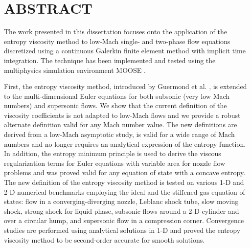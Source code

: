 %
%
%

\chapter*{ABSTRACT}

\pagestyle{plain} %
\setcounter{page}{2}

The work presented in this dissertation focuses onto the application of the entropy viscosity method to low-Mach single- and two-phase flow equations discretized using a continuous Galerkin finite element method with implicit time integration. The technique has been implemented and tested using the multiphysics simulation environment MOOSE \cite{Moose}. 

First,  
the entropy viscosity method, introduced by Guermond et al. \cite{jlg1, jlg2}, is extended to the multi-dimensional Euler 
equations for both subsonic (very low Mach numbers) and supersonic flows. 
We show that the current definition of the viscosity coefficients \cite{jlg1, jlg2} is not adapted to low-Mach flows 
and we provide a robust alternate definition valid for any Mach number value. The new definitions are derived from a 
low-Mach asymptotic study, is valid for a wide range of Mach numbers and no longer requires an analytical expression of the entropy function. In addition, the entropy minimum principle is used to derive 
the viscous regularization terms for Euler equations with variable area for nozzle flow problems and was proved valid for any equation of state with a concave entropy. 
The new definition of the entropy viscosity method is tested on various 1-D and 2-D numerical benchmarks employing the ideal and the stiffened gas equation of states: flow in a converging-diverging nozzle, Leblanc shock tube, slow moving 
shock, strong shock for liquid phase, subsonic flows around a 2-D cylinder and over a circular hump, and supersonic flow in a 
compression corner. Convergence studies are performed using analytical solutions in 1-D and proved the entropy viscosity method to be second-order accurate for smooth solutions.

